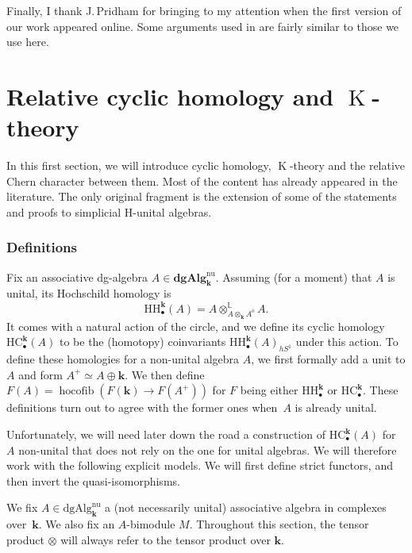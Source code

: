 \documentclass[JEP,XML,SOM,Unicode,NoEqCountersInSection]{cedram}
\newcommand{\sbullet}{{\scriptscriptstyle\bullet}}
\theoremstyle{definition}
\newcommand{\Lcot}{\mathbb{L}}
\newcommand{\dgAlg}{\mathbf{dgAlg}}
\DeclareMathOperator{\K}{K}
\newcommand{\MCdgAlg}{\mathrm{dgAlg}}
\newcommand{\HC}{\mathrm{HC}}
\newcommand{\HH}{\mathrm{HH}}
\renewcommand{\k}{{\boldsymbol{k}}}
\begin{document}
Finally, I thank J.\,Pridham for bringing \cite{pridham:smoothfunctions} to my attention when the first version of our work appeared online. Some arguments used in \cite{pridham:smoothfunctions} are fairly similar to those we use here.

\section{Relative cyclic homology and \texorpdfstring{$\K$}{K}-theory}

In this first section, we will introduce cyclic homology, $\K$-theory and the relative Chern character between them. Most of the content has already appeared in the literature.
The only original fragment is the extension of some of the statements and proofs to simplicial H-unital algebras.

\label{subsec:cyclic}

\subsubsection{Definitions}
Fix an associative dg-algebra $A \in \dgAlg^\mathrm{nu}_\k$. Assuming (for a moment) that $A$ is unital, its Hochschild homology is
\[
\HH_\sbullet^\k(A) = A \otimes^{\Lcot}_{A \otimes_\k A^o} A.
\]
It comes with a natural action of the circle, and we define its cyclic homology $\HC_\sbullet^\k(A)$ to be the (homotopy) coinvariants $\HH_\sbullet^\k(A)_{hS^1}$ under this action.
To define these homologies for a non-unital algebra $A$, we first formally add a unit to $A$ and form $A^+ \simeq A \oplus \k$. We then define $F(A) = \operatorname{hocofib}(F(\k) \to F(A^+))$ for $F$ being either $\HH_\sbullet^\k$ or $\HC_\sbullet^\k$. These definitions turn out to agree with the former ones when~$A$ is already unital.

Unfortunately, we will need later down the road a construction of $\HC_\sbullet^\k(A)$ for $A$ non-unital that does not rely on the one for unital algebras. We will therefore work with the following explicit models. We will first define strict functors, and then invert the quasi-isomorphisms.

We fix $A \in \MCdgAlg_\k^{\mathrm{nu}}$ a (not necessarily unital) associative algebra in complexes over~$\k$. We also fix an $A$-bimodule $M$.
Throughout this section, the tensor product $\otimes$ will always refer to the tensor product over $\k$.
\end{document}

